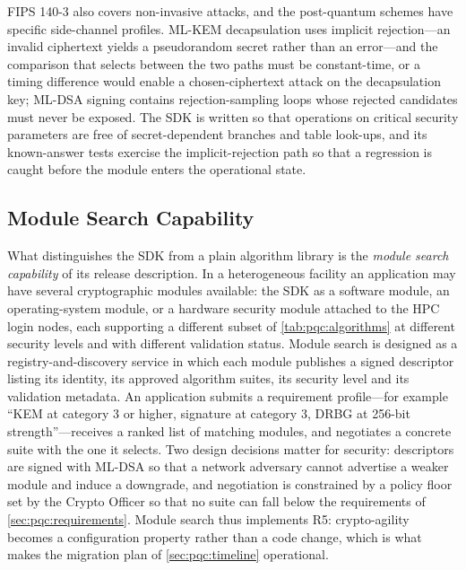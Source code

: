 FIPS 140-3 also covers non-invasive attacks, and the post-quantum schemes have specific side-channel profiles. ML-KEM decapsulation uses implicit rejection---an invalid ciphertext yields a pseudorandom secret rather than an error---and the comparison that selects between the two paths must be constant-time, or a timing difference would enable a chosen-ciphertext attack on the decapsulation key; ML-DSA signing contains rejection-sampling loops whose rejected candidates must never be exposed. The SDK is written so that operations on critical security parameters are free of secret-dependent branches and table look-ups, and its known-answer tests exercise the implicit-rejection path so that a regression is caught before the module enters the operational state.

\subsection{Module Search Capability}\label{sec:pqc:search}

What distinguishes the SDK from a plain algorithm library is the \emph{module search capability} of its release description. In a heterogeneous facility an application may have several cryptographic modules available: the SDK as a software module, an operating-system module, or a hardware security module attached to the HPC login nodes, each supporting a different subset of \cref{tab:pqc:algorithms} at different security levels and with different validation status. Module search is designed as a registry-and-discovery service in which each module publishes a signed descriptor listing its identity, its approved algorithm suites, its security level and its validation metadata. An application submits a requirement profile---for example ``KEM at category 3 or higher, signature at category 3, DRBG at 256-bit strength''---receives a ranked list of matching modules, and negotiates a concrete suite with the one it selects. Two design decisions matter for security: descriptors are signed with ML-DSA so that a network adversary cannot advertise a weaker module and induce a downgrade, and negotiation is constrained by a policy floor set by the Crypto Officer so that no suite can fall below the requirements of \cref{sec:pqc:requirements}. Module search thus implements R5: crypto-agility becomes a configuration property rather than a code change, which is what makes the migration plan of \cref{sec:pqc:timeline} operational.

